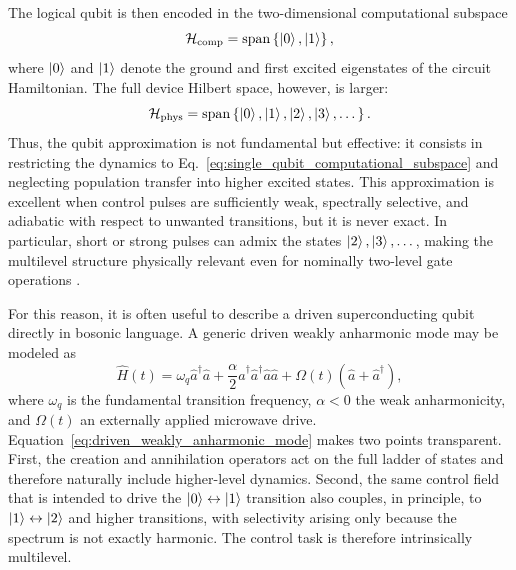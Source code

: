 The logical qubit is then encoded in the two-dimensional computational subspace
\begin{equation}
\mathcal{H}_{\mathrm{comp}}
=
\mathrm{span}\left\{\ket{0},\ket{1}\right\},
\label{eq:single_qubit_computational_subspace}
\end{equation}
where $\ket{0}$ and $\ket{1}$ denote the ground and first excited eigenstates of the circuit Hamiltonian. The full device Hilbert space, however, is larger:
\begin{equation}
\mathcal{H}_{\mathrm{phys}}
=
\mathrm{span}\left\{\ket{0},\ket{1},\ket{2},\ket{3},\dots\right\}.
\label{eq:physical_hilbert_space_multilevel}
\end{equation}
Thus, the qubit approximation is not fundamental but effective: it consists in restricting the dynamics to Eq.~\eqref{eq:single_qubit_computational_subspace} and neglecting population transfer into higher excited states. This approximation is excellent when control pulses are sufficiently weak, spectrally selective, and adiabatic with respect to unwanted transitions, but it is never exact. In particular, short or strong pulses can admix the states $\ket{2},\ket{3},\dots$, making the multilevel structure physically relevant even for nominally two-level gate operations \cite{Krantz2019,Kjaergaard2020}.

For this reason, it is often useful to describe a driven superconducting qubit directly in bosonic language. A generic driven weakly anharmonic mode may be modeled as
\begin{equation}
\hat{H}(t)
=
\omega_q \hat{a}^{\dagger}\hat{a}
+
\frac{\alpha}{2}\hat{a}^{\dagger}\hat{a}^{\dagger}\hat{a}\hat{a}
+
\Omega(t)\left(\hat{a}+\hat{a}^{\dagger}\right),
\label{eq:driven_weakly_anharmonic_mode}
\end{equation}
where $\omega_q$ is the fundamental transition frequency, $\alpha<0$ the weak anharmonicity, and $\Omega(t)$ an externally applied microwave drive. Equation~\eqref{eq:driven_weakly_anharmonic_mode} makes two points transparent. First, the creation and annihilation operators act on the full ladder of states and therefore naturally include higher-level dynamics. Second, the same control field that is intended to drive the $\ket{0}\leftrightarrow\ket{1}$ transition also couples, in principle, to $\ket{1}\leftrightarrow\ket{2}$ and higher transitions, with selectivity arising only because the spectrum is not exactly harmonic. The control task is therefore intrinsically multilevel.


